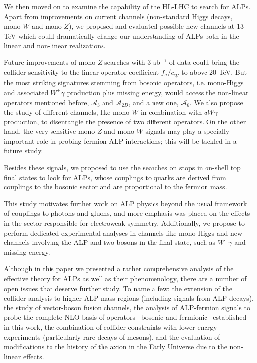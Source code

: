 \documentclass[11pt]{article}
\newcommand{\g}{\gamma}
\newcommand{\A}{\mathcal{A}}
\renewcommand{\[}{\begin{equation}}
\renewcommand{\]}{\end{equation}}
\begin{document}
\vspace{-2mm}

We then moved on to examine the capability of the HL-LHC to search for ALPs. Apart from improvements on 
current channels (non-standard Higgs decays, mono-$W$ and mono-$Z$), we proposed and evaluated possible new channels at 13 TeV which could dramatically change 
 our understanding of ALPs both in the linear and non-linear realizations. 
 
 Future improvements of mono-$Z$ searches with 3 ab$^{-1}$ of data could bring the collider sensitivity to the linear operator coefficient $f_a/c_{\tilde W}$ to above 
 20 TeV. But the most striking signatures stemming from bosonic operators,  i.e.  mono-Higgs and associated $W^\pm \gamma$ production plus missing energy, would access the non-linear 
 operators mentioned before,  $\A_3$ and $\A_{2D}$, and a new one, $\A_6$.  We also propose the study of different channels, 
 like mono-$W$ in combination with $aW\g$ production, to disentangle the presence of  two different operators.  On the other hand, the very sensitive mono-$Z$ and mono-$W$ signals may play a specially important role in probing fermion-ALP interactions; this will be tackled in a future study.
 
Besides these signals, we proposed to use the searches on stops in on-shell top final states to look for ALPs, whose couplings to 
quarks are derived from couplings to the bosonic sector and are proportional to the fermion mass.    

This study motivates further work on ALP physics beyond the usual framework of couplings to photons and gluons, and more emphasis was 
placed on the effects in the sector responsible for electroweak symmetry. Additionally, we propose to perform dedicated experimental 
analyses in channels like mono-Higgs and new channels involving the ALP and two bosons in the final state, such as $W^\pm \gamma$ and missing energy. 



Although in this paper we presented a rather comprehensive analysis of the effective theory for ALPs as well as their phenomenology,  
there are a number of open issues that deserve further study. To name a few: the extension of the collider analysis to higher ALP mass regions (including signals from ALP decays), 
the study of vector-boson fusion channels,  the analysis of ALP-fermion signals to probe the complete NLO basis of operators --bosonic and fermionic-- established in this work, the combination of collider constraints with lower-energy experiments (particularly rare decays of mesons), and the evaluation of modifications 
to the history of the axion in the Early Universe due to the non-linear effects. 
\end{document}
